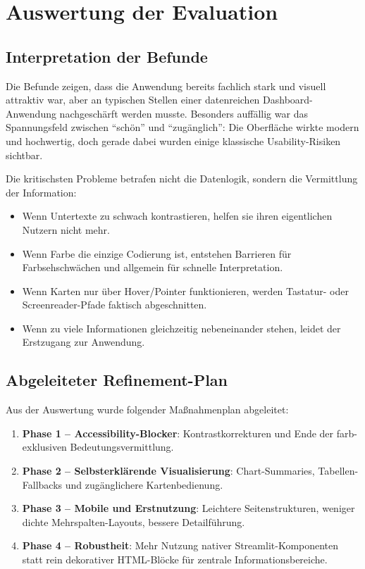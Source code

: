 \documentclass[11pt,a4paper]{article}
\begin{document}
\section{Auswertung der Evaluation}
\subsection{Interpretation der Befunde}
Die Befunde zeigen, dass die Anwendung bereits fachlich stark und visuell attraktiv war, aber an typischen Stellen einer datenreichen Dashboard-Anwendung nachgeschärft werden musste. Besonders auffällig war das Spannungsfeld zwischen ``schön'' und ``zugänglich'': Die Oberfläche wirkte modern und hochwertig, doch gerade dabei wurden einige klassische Usability-Risiken sichtbar.

Die kritischsten Probleme betrafen nicht die Datenlogik, sondern die Vermittlung der Information:

\begin{itemize}[leftmargin=1.2cm]
\item Wenn Untertexte zu schwach kontrastieren, helfen sie ihren eigentlichen Nutzern nicht mehr.
\item Wenn Farbe die einzige Codierung ist, entstehen Barrieren für Farbsehschwächen und allgemein für schnelle Interpretation.
\item Wenn Karten nur über Hover/Pointer funktionieren, werden Tastatur- oder Screenreader-Pfade faktisch abgeschnitten.
\item Wenn zu viele Informationen gleichzeitig nebeneinander stehen, leidet der Erstzugang zur Anwendung.
\end{itemize}

\subsection{Abgeleiteter Refinement-Plan}
Aus der Auswertung wurde folgender Maßnahmenplan abgeleitet:

\begin{enumerate}[leftmargin=1.2cm]
\item \textbf{Phase 1 -- Accessibility-Blocker}: Kontrastkorrekturen und Ende der farb-exklusiven Bedeutungsvermittlung.
\item \textbf{Phase 2 -- Selbsterklärende Visualisierung}: Chart-Summaries, Tabellen-Fallbacks und zugänglichere Kartenbedienung.
\item \textbf{Phase 3 -- Mobile und Erstnutzung}: Leichtere Seitenstrukturen, weniger dichte Mehrspalten-Layouts, bessere Detailführung.
\item \textbf{Phase 4 -- Robustheit}: Mehr Nutzung nativer Streamlit-Komponenten statt rein dekorativer HTML-Blöcke für zentrale Informationsbereiche.
\end{enumerate}
\end{document}
